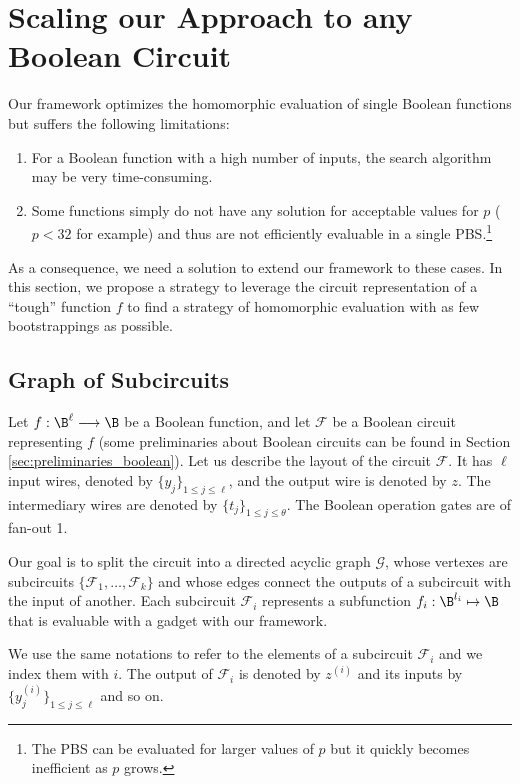 \section{Scaling our Approach to any Boolean Circuit}
\label{sec:graphs}

Our framework optimizes the homomorphic evaluation of single Boolean functions but suffers the following limitations:

\begin{enumerate}
    \item For a Boolean function with a high number of inputs, the search algorithm may be very time-consuming.
    \item Some functions simply do not have any solution for acceptable values for $p$ ($p < 32$ for example) and thus are not efficiently evaluable in a single PBS.\footnote{The PBS can be evaluated for larger values of $p$ but it quickly becomes inefficient as $p$ grows.}
\end{enumerate}


As a consequence, we need a solution to extend our framework to these cases. In this section, we propose a strategy to leverage the circuit representation of a ``tough'' function $f$ to find a strategy of homomorphic evaluation with as few bootstrappings as possible.


\subsection{Graph of Subcircuits}
\label{sec:graph_definition}

Let $f: \B^\ell \longrightarrow \B$ be a Boolean function, and let $\mathcal{F}$ be a Boolean circuit representing $f$ (some preliminaries about Boolean circuits can be found in Section \ref{sec:preliminaries_boolean}). Let us describe the layout of the circuit $\mathcal{F}$. It has $\ell$ input wires, denoted by $\{y_j\}_{1 \le j \le \ell}$, and the output wire is denoted by $z$. The intermediary wires are denoted by $\{t_j\}_{1 \le j \le \theta}$. The Boolean operation gates are of fan-out 1. 


Our goal is to split the circuit into a directed acyclic graph $\mathcal{G}$, whose vertexes are subcircuits $\{\mathcal{F}_1, \dots, \mathcal{F}_k\}$ and whose edges connect the outputs of a subcircuit with the input of another. Each subcircuit $\mathcal{F}_i$ represents a subfunction $f_i: \B^{l_i} \mapsto \B$ that is evaluable with a gadget with our framework. 

We use the same notations to refer to the elements of a subcircuit $\mathcal{F}_i$ and we index them with $i$. The output of $\mathcal{F}_i$ is denoted by $z^{(i)}$ and its inputs by $\{y_j^{(i)}\}_{1 \le j \le \ell}$ and so on. 


